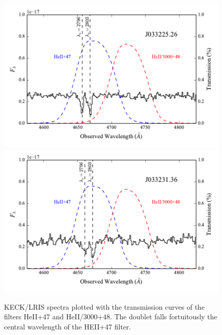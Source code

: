 \documentclass[twocolumn]{aastex6}
\begin{document}
\begin{figure}[!htb]
\includegraphics[scale=0.58]{../Figures/filt_26_spectra.pdf}
\includegraphics[scale=0.58]{../Figures/filt_36_spectra.pdf}
\caption{KECK/LRIS spectra plotted with the transmission curves of the filters HeII+47 and HeII/3000+48. The  doublet falls fortuitously the central wavelength of the HEII+47 filter. }
\label{fig:spec_images}
\end{figure}
\end{document}
